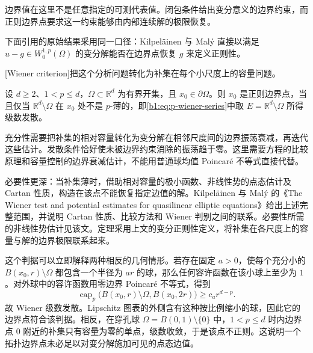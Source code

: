 边界值在这里不是任意指定的可测代表值。闭包条件给出变分意义的边界约束，而正则边界点要求这一约束能够由内部连续解的极限恢复。

\ProseParagraphBreak

下面引用的原始结果采用同一口径：Kilpeläinen 与 Malý 直接以满足 \(u-g\in W_0^{1,p}(\Omega)\) 的变分解能否在边界点恢复 \(g\) 来定义正则性\cite[p. 137 and THEOREM 1.1]{Kilpelainen1994Wiener}。

\ProseParagraphBreak

[Wiener criterion]把这个分析问题转化为补集在每个小尺度上的容量问题。
\begin{theorem}[Wiener]\label{b1:thm:p-wiener-criterion}
设 \(d\ge2\)、\(1<p\le d\)，\(\Omega\subset\mathbb R^d\) 为有界开集，且 \(x_0\in\partial\Omega\)。则 \(x_0\) 是正则边界点，当且仅当 \(\mathbb R^d\setminus\Omega\) 在 \(x_0\) 处不是 \(p\)-薄的，即\eqref{b1:eq:p-wiener-series}中取 \(E=\mathbb R^d\setminus\Omega\) 所得级数发散。
\end{theorem}
\begin{proofsketch}
充分性需要把补集的相对容量转化为变分解在相邻尺度间的边界振荡衰减，再迭代这些估计。发散条件恰好使未被边界约束消除的振荡趋于零。这里需要方程的比较原理和容量控制的边界衰减估计，不能用普通球均值 Poincaré 不等式直接代替。

必要性更深：当补集薄时，借助相对容量的极小函数、非线性势的点态估计及 Cartan 性质，构造在该点不能恢复指定边值的解。Kilpeläinen 与 Malý 的《The Wiener test and potential estimates for quasilinear elliptic equations》\cite[THEOREM 1.1 and Section 5]{Kilpelainen1994Wiener}给出上述完整范围，并说明 Cartan 性质、比较方法和 Wiener 判别之间的联系。必要性所需的非线性势估计见该文。定理采用上文的变分正则性定义，将补集在各尺度上的容量与解的边界极限联系起来。
\end{proofsketch}

这个判据可以立即解释两种相反的几何情形。若存在固定 \(a>0\)，使每个充分小的 \(B(x_0,r)\setminus\Omega\) 都包含一个半径为 \(ar\) 的球，那么任何容许函数在该小球上至少为 \(1\)。对外球中的容许函数用零边界 Poincaré 不等式，得到
\[
 \operatorname{cap}_p\bigl(B(x_0,r)\setminus\Omega,B(x_0,2r)\bigr)
 \ge c_a r^{d-p}.
\]
故 Wiener 级数发散。Lipschitz 图表的外侧含有这种按比例缩小的球，因此它的边界点符合该判据。相反，在穿孔球 \(\Omega=B(0,1)\setminus\{0\}\) 中，\(1<p\le d\) 时内边界点 \(0\) 附近的补集只有容量为零的单点，级数收敛，于是该点不正则。这说明一个拓扑边界点未必足以对变分解施加可见的点态边值。


